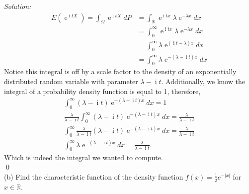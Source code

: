 \documentclass[10pt]{amsart}
\DeclareMathOperator{\E}{e}
\DeclareMathOperator{\I}{i}
\begin{document}
\noindent
\textit{Solution:}
\begin{align*}
E(\E^{\I tX}) = \int_\Omega \E^{\I tX} dP
	&= \int_{\mathbb R} \E^{\I tx} \lambda \E^{-\lambda x} dx \\
	&= \int_{0}^\infty \E^{\I tx} \lambda \E^{-\lambda x} dx \\
	&= \int_{0}^\infty \lambda \E^{(\I t -\lambda) x} dx \\
	&= \int_{0}^\infty \lambda \E^{-(\lambda- \I t) x} dx
\end{align*}
Notice this integral is off by a scale factor to the density of an exponentially distributed random variable with parameter $\lambda - \I t$.
Additionally, we know the integral of a probability density function is equal to 1, therefore, 
\begin{align*}
\int_{0}^\infty (\lambda - \I t) \E^{-(\lambda- \I t) x} dx = 1 \\
\frac \lambda {\lambda - \I t} \int_{0}^\infty (\lambda - \I t) \E^{-(\lambda- \I t) x} dx = \frac \lambda {\lambda - \I t} \\
\int_{0}^\infty \frac \lambda {\lambda - \I t} (\lambda - \I t) \E^{-(\lambda- \I t) x} dx = \frac \lambda {\lambda - \I t} \\
\int_{0}^\infty \lambda \E^{-(\lambda- \I t) x} dx = \frac \lambda {\lambda - \I t}.
\end{align*}
Which is indeed the integral we wanted to compute. \\
\qed \\

\noindent
(b) Find the characteristic function of the density function $f(x)=\frac{1}{2}e^{-|x|}$ for $x\in \mathds{R}$.
\\
\end{document}
